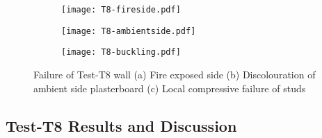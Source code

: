 \begin{figure}[!htbp]
	\centering
	\begin{subfigure}[b]{0.7\textwidth}
		\centering
		\texttt{[image: T8-fireside.pdf]}
		\caption{}
		\label{subfig:T8-fireside}
	\end{subfigure}
	\begin{subfigure}[b]{0.35\textwidth}
		\centering
		\texttt{[image: T8-ambientside.pdf]}
		\caption{}
		\label{subfig:T8-ambientside}
	\end{subfigure}
	\begin{subfigure}[b]{0.35\textwidth}
		\centering
		\texttt{[image: T8-buckling.pdf]}
		\caption{}
		\label{subfig:T8-buckling}
	\end{subfigure}
	   \caption{Failure of Test-T8 wall (a) Fire exposed side (b) Discolouration of ambient side plasterboard (c) Local compressive failure of studs}
	   \label{fig:T8-failure}
\end{figure}

\subsection{Test-T8 Results and Discussion}

